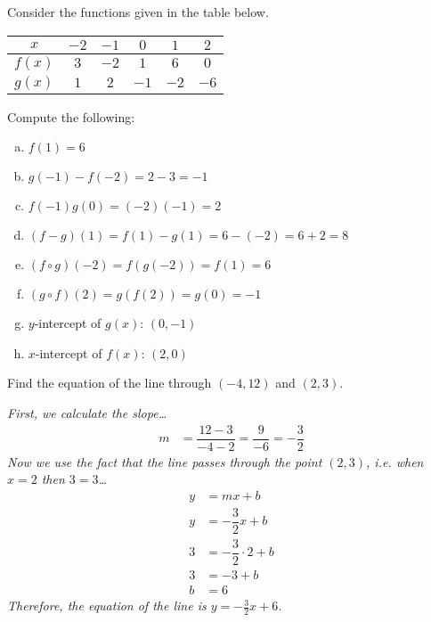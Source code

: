 \documentclass[12pt,letterpaper]{exam}
\begin{document}
\begin{questions}
\question[10] Consider the functions given in the table below.
        \begin{table}[!ht]
        \centering
        \begin{tabular}{| c || c | c | c | c | c |} \hline
	$x$ & $-2$ & $-1$ & $0$ & $1$ & $2$ \\ \hline
	$f(x)$ & $3$ & $-2$ & $1$ & $6$ & $0$ \\ \hline
	$g(x)$ & $1$ & $2$ & $-1$ & $-2$ & $-6$ \\ \hline
        \end{tabular}
        \end{table}

Compute the following: \pspace
        \begin{enumerate}[(a)]
        \item $f(1)= 6$ \vfill
        \item $g(-1) - f(-2)= 2 - 3= -1$ \vfill
        \item $f(-1)g(0)= (-2) (-1)= 2$ \vfill
        \item $(f - g)(1)= f(1) - g(1)= 6 - (-2)= 6 + 2= 8$ \vfill
        \item $(f \circ g)(-2)= f(g(-2))= f(1)= 6$ \vfill
        \item $(g \circ f)(2)= g(f(2))= g(0)= -1$ \vfill
        \item $y$-intercept of $g(x)$: $(0, -1)$ \vfill
        \item $x$-intercept of $f(x)$: $(2, 0)$ \vfill
        \end{enumerate}



\newpage



\question[8] Find the equation of the line through $(-4, 12)$ and $(2, 3)$. \pvspace{1.3cm}

{\itshape First, we calculate the slope\dots
	\[
	\begin{aligned}
	m&= \dfrac{12 - 3}{-4 - 2}= \dfrac{9}{-6}= -\dfrac{3}{2}
	\end{aligned}
	\]
Now we use the fact that the line passes through the point $(2, 3)$, i.e. when $x= 2$ then $3= 3$\dots
	\[
	\begin{aligned}
	y&= mx + b \\
	y&= -\dfrac{3}{2} x + b \\
	3&= -\dfrac{3}{2} \cdot 2 + b \\
	3&= -3 + b \\
	b&= 6
	\end{aligned}
	\]
Therefore, the equation of the line is $y= -\frac{3}{2}x + 6$. 
}




\end{questions}
\end{document}
